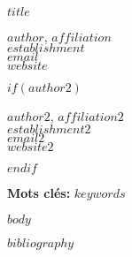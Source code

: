 \documentclass[10pt]{article}
\begin{document}


\renewcommand{\tablename}{\textsc{Tableau}}

\begin{center}
\textsf{\LARGE \textbf{$title$}}
\end{center}

\begin{flushright}
\textsc{$author$, $affiliation$} \\
\textsc{$establishment$} \\
$email$ \\
$website$
\end{flushright}

$if(author2)$
\begin{flushright}
\textsc{$author2$, $affiliation2$} \\
\textsc{$establishment2$} \\
$email2$ \\
$website2$
\end{flushright}
$endif$

\baselineskip


\begin{abstract}

$abstract$

\end{abstract}

\textbf{Mots clés: } $keywords$

\bigskip

$body$

$bibliography$
\end{document}
